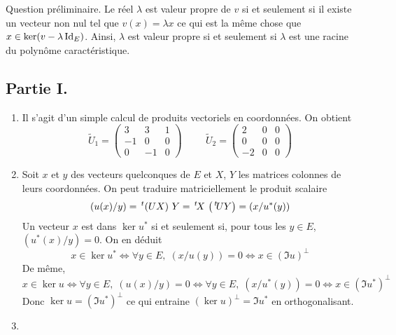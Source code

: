 Question préliminaire.\newline
Le réel $\lambda$ est valeur propre de $v$ si et seulement si il existe un vecteur non nul tel que $v(x)=\lambda x$ ce qui est la même chose que $x\in\ker(v-\lambda\operatorname{Id}_E)$. Ainsi, $\lambda$ est valeur propre si et seulement si $\lambda$ est une racine du polynôme caractéristique. 
\subsection*{Partie I.}
\begin{enumerate}
 \item Il s'agit d'un simple calcul de produits vectoriels en coordonnées. On obtient
\begin{displaymath}
 \widetilde{U}_1 =
\begin{pmatrix}
 3 & 3 & 1 \\ -1 & 0 & 0 \\ 0 & -1 & 0
\end{pmatrix}
\hspace{1cm}
 \widetilde{U}_2 =
\begin{pmatrix}
 2 & 0 & 0 \\ 0 & 0 & 0 \\ -2 & 0 & 0
\end{pmatrix}
\end{displaymath}
\item Soit $x$ et $y$ des vecteurs quelconques de $E$ et $X$, $Y$ les matrices colonnes de leurs coordonnées. On peut traduire matriciellement le produit scalaire
\begin{displaymath}
 (u(x)/y) = \,\mathstrut^t\!\left( U X\right) \, Y = \,\mathstrut^t\!{X}\, \left(\,\mathstrut^t\!{U}Y\right) = (x/ u^*(y))
\end{displaymath}
 Un vecteur $x$ est dans $\ker u^*$ si et seulement si, pour tous les $y\in E$, $(u^*(x)/y)=0$. On en déduit
\begin{displaymath}
 x\in \ker u^* \Leftrightarrow \forall y\in E,\; (x/u(y))=0
\Leftrightarrow x\in (\Im u)^{\perp}
\end{displaymath}
 De même,
\begin{displaymath}
 x\in \ker u \Leftrightarrow \forall y\in E,\; (u(x)/y)=0
\Leftrightarrow \forall y\in E,\; (x/u^*(y))=0
\Leftrightarrow x\in (\Im u^*)^{\perp}
\end{displaymath}
Donc $\ker u = (\Im u^*)^{\perp}$ ce qui entraine $(\ker u)^{\perp} = \Im u^*$ en orthogonalisant.
 \item 
\begin{enumerate}

\end{enumerate}
\end{enumerate}
